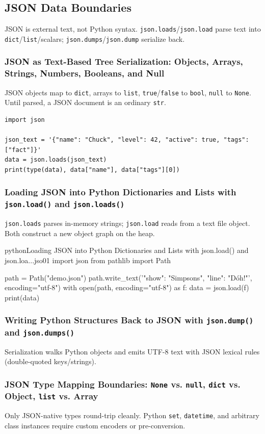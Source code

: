 \subsection{JSON Data Boundaries}

JSON is external text, not Python syntax. \texttt{json.loads}/\texttt{json.load} parse text into \texttt{dict}/\texttt{list}/scalars; \texttt{json.dumps}/\texttt{json.dump} serialize back.

\subsubsection{JSON as Text-Based Tree Serialization: Objects, Arrays, Strings, Numbers, Booleans, and Null}

JSON objects map to \texttt{dict}, arrays to \texttt{list}, \texttt{true}/\texttt{false} to \texttt{bool}, \texttt{null} to \texttt{None}. Until parsed, a JSON document is an ordinary \texttt{str}.

\begin{verbatim}
import json

json_text = '{"name": "Chuck", "level": 42, "active": true, "tags": ["fact"]}'
data = json.loads(json_text)
print(type(data), data["name"], data["tags"][0])
\end{verbatim}

\subsubsection{Loading JSON into Python Dictionaries and Lists with \texttt{json.load()} and \texttt{json.loads()}}

\texttt{json.loads} parses in-memory strings; \texttt{json.load} reads from a text file object. Both construct a new object graph on the heap.

\begin{codebox}[]{python}{Loading JSON into Python Dictionaries and Lists with json.load() and json.loa...}{jso01}
import json
from pathlib import Path

path = Path("demo.json")
path.write_text('{"show": "Simpsons", "line": "D\'oh!"}', encoding="utf-8")
with open(path, encoding="utf-8") as f:
    data = json.load(f)
print(data)
\end{codebox}


\subsubsection{Writing Python Structures Back to JSON with \texttt{json.dump()} and \texttt{json.dumps()}}

Serialization walks Python objects and emits UTF-8 text with JSON lexical rules (double-quoted keys/strings).

\subsubsection{JSON Type Mapping Boundaries: \texttt{None} vs. \texttt{null}, \texttt{dict} vs. Object, \texttt{list} vs. Array}

Only JSON-native types round-trip cleanly. Python \texttt{set}, \texttt{datetime}, and arbitrary class instances require custom encoders or pre-conversion.

